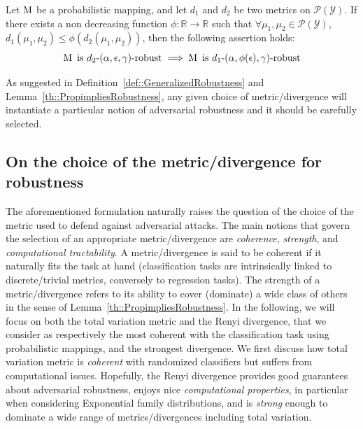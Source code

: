 \begin{lemma}
  Let $\operatorname*{M}$ be a probabilistic mapping, and let  $d_{1}$ and $d_{2}$ be two metrics on $\mathcal{P}(\mathcal{Y})$.
  If there exists a non decreasing function $ \phi: \mathbb{R} \to \mathbb{R}$ such that $\forall \mu_1,\mu_2 \in \mathcal{P}(\mathcal{Y})$, $d_{1}(\mu_1,\mu_2) \leq \phi(d_{2}(\mu_1,\mu_2)) $, then the following assertion holds: 
  \begin{equation}
    \operatorname*{M} \text{ is } d_{2}\text{-}(\alpha, \epsilon, \gamma)\text{-robust} \implies \operatorname*{M} \text{ is }d_{1}\text{-}(\alpha, \phi(\epsilon), \gamma)\text{-robust}
  \end{equation}
\label{th::PropimpliesRobustness}
\end{lemma}

As suggested in Definition~\ref{def::GeneralizedRobustness} and Lemma~\ref{th::PropimpliesRobustness}, any given choice of metric/divergence will instantiate a particular notion of adversarial robustness and it should be carefully selected. 

\subsection{On the choice of the metric/divergence for robustness}
\label{subsec:div}

The aforementioned formulation naturally raises the question of the choice of the metric used to defend against adversarial attacks. 
The main notions that govern the selection of an appropriate metric/divergence are  \emph{coherence}, \emph{strength}, and \emph{computational tractability}.
A metric/divergence is said to be coherent if it naturally fits the task at hand (\eg classification tasks are intrinsically linked to discrete/trivial metrics, conversely to regression tasks).
The strength of a metric/divergence refers to its ability to cover (dominate) a wide class of others in the sense of Lemma~\ref{th::PropimpliesRobustness}. 
In the following, we will focus on both the total variation metric and the Renyi divergence, that we consider as respectively the most coherent with the classification task using probabilistic mappings, and the strongest divergence.
We first discuss how total variation metric is \emph{coherent} with randomized classifiers but suffers from computational issues.
Hopefully, the Renyi divergence provides good guarantees about adversarial robustness, enjoys nice \emph{computational properties}, in particular when considering  Exponential family distributions, and is \emph{strong} enough to dominate a wide range of metrics/divergences including total variation.


